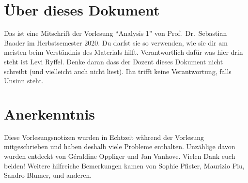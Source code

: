 \documentclass[../main.tex]{subfiles}
\begin{document}
\section*{Über dieses Dokument}
Das ist eine Mitschrift
der Vorlesung ``Analysis 1''
von Prof.\ Dr.\ Sebastian Baader
im Herbstsemester 2020.
Du darfst sie so verwenden,
wie sie dir am meisten
beim Verständnis des Materials
hilft.
Verantwortlich dafür was
hier drin steht ist Levi Ryffel.
Denke daran dass der Dozent dieses Dokument
nicht schreibt (und vielleicht auch nicht liest).
Ihn trifft keine Verantwortung, falls
Unsinn steht.

\section*{Anerkenntnis}
Diese Vorlesungsnotizen wurden in Echtzeit während der Vorlesung mitgeschrieben
und haben deshalb viele Probleme enthalten.
Unzählige davon wurden entdeckt von Géraldine Oppliger und Jan Vanhove.
Vielen Dank euch beiden! Weitere hilfreiche Bemerkungen kamen
von Sophie Pfister, Maurizio Piu, Sandro Blumer, und anderen.
\end{document}

